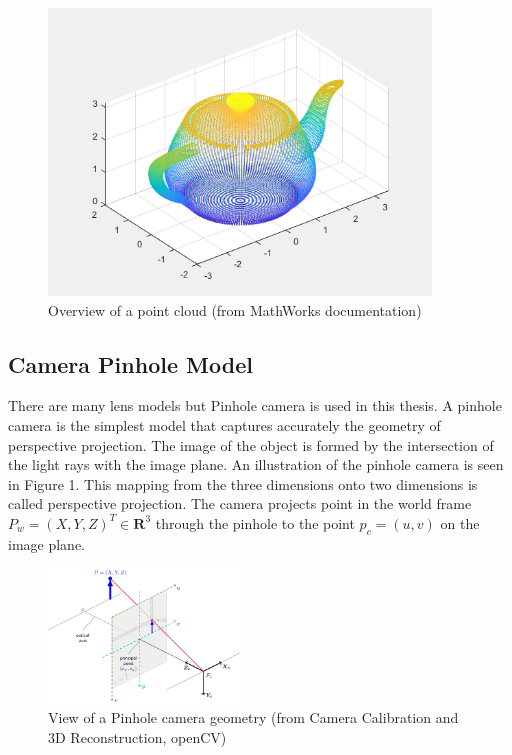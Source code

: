\begin{figure}[!h]
\begin{center}
\includegraphics[width=4in]{figures02/pcd.png}
\caption{Overview of a point cloud (from MathWorks documentation)}%
\end{center}
\label{fig2:mypicture3}
\end{figure}


\subsection{ Camera Pinhole Model}\label{pinhole}
There are many lens models but Pinhole camera is used in this thesis. A pinhole camera is the simplest model that captures accurately the geometry of perspective projection. The image of the object is formed by the intersection of the light rays with the image plane. An illustration of the pinhole camera is seen in  Figure 1. This mapping from the three dimensions onto two dimensions is called perspective projection. The camera projects point in the world frame $ P_{w}=(X,Y,Z)^{T} \in \textbf{R}^{3}$ through the pinhole to  the point $p_{c}=(u,v)$ on the image plane.
 
\begin{figure}[!h]
\begin{center}
\includegraphics[width=2in]{figures02/pinhole_camera_model.png}
\caption{View of a Pinhole camera geometry (from Camera Calibration and 3D Reconstruction, openCV)}%
\end{center}
\end{figure}

